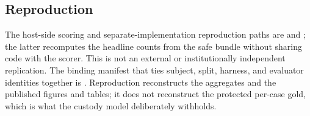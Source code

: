 \subsection{Reproduction}
The host-side scoring and separate-implementation reproduction paths are  and ; the latter recomputes the headline counts from the safe bundle without sharing code with the scorer. This is not an external or institutionally independent replication. The binding manifest that ties subject, split, harness, and evaluator identities together is . Reproduction reconstructs the aggregates and the published figures and tables; it does not reconstruct the protected per-case gold, which is what the custody model deliberately withholds.
